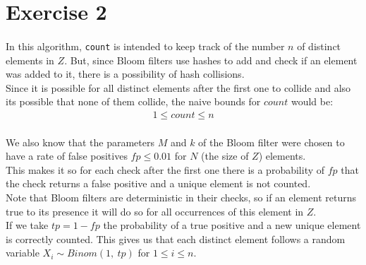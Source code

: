 \documentclass[../main.tex]{subfiles}
\begin{document}
\section{Exercise 2}
\label{sec:ex2}

\paragraph{} In this algorithm, \texttt{count} is intended to keep track of the number \(n\) of distinct elements in \(Z\). But, since Bloom filters use hashes to add and check if an element was added to it, there is a possibility of hash collisions. \\
Since it is possible for all distinct elements after the first one to collide and also its possible that none of them collide, the naive bounds for \(count\) would be:
\begin{align*}
  1 \leq count \leq n
\end{align*}

\paragraph{} We also know that the parameters \(M\) and \(k\) of the Bloom filter were chosen to have a rate of false positives \(fp \leq 0.01\) for \(N\) (the size of \(Z\)) elements. \\
This makes it so for each check after the first one there is a probability of \(fp\) that the check returns a false positive and a unique element is not counted. \\
Note that Bloom filters are deterministic in their checks, so if an element returns true to its presence it will do so for all occurrences of this element in \(Z\). \\ %
If we take \(tp = 1 - fp\) the probability of a true positive and a new unique element is correctly counted. This gives us that each distinct element follows a random variable \(X_{i} \sim Binom(1,\ tp)\) for \(1 \leq i \leq n\).
\end{document}

